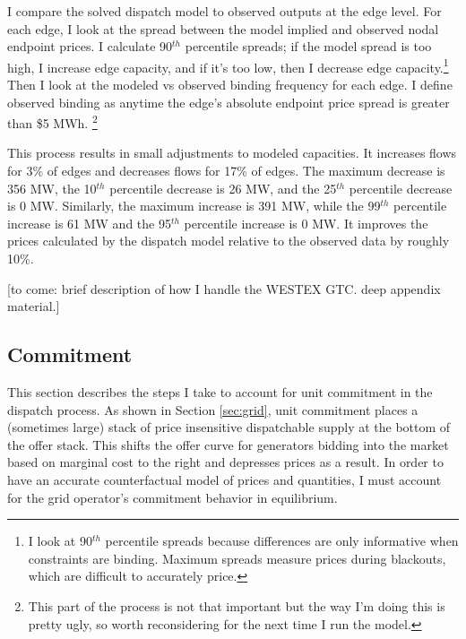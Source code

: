 \documentclass[12pt]{article}
\begin{document}
I compare the solved dispatch model to observed outputs at the edge level. For each edge, I look at the spread between the model implied and observed nodal endpoint prices. I calculate 90$^{th}$ percentile spreads; if the model spread is too high, I increase edge capacity, and if it's too low, then I decrease edge capacity.\footnote{I look at 90$^{th}$ percentile spreads because differences are only informative when constraints are binding. Maximum spreads measure prices during blackouts, which are difficult to accurately price.} Then I look at the modeled vs observed binding frequency for each edge. I define observed binding as anytime the edge's absolute endpoint price spread is greater than \$5 MWh. \footnote{This part of the process is not that important but the way I'm doing this is pretty ugly, so worth reconsidering for the next time I run the model.} 

This process results in small adjustments to modeled capacities. It increases flows for 3\% of edges and decreases flows for 17\% of edges. The maximum decrease is 356 MW, the 10$^{th}$ percentile decrease is 26 MW, and the 25$^{th}$ percentile decrease is 0 MW. Similarly, the maximum increase is 391 MW, while the 99$^{th}$ percentile increase is 61 MW and the 95$^{th}$ percentile increase is 0 MW. It improves the prices calculated by the dispatch model relative to the observed data by roughly 10\%. 

[to come: brief description of how I handle the WESTEX GTC. deep appendix material.]

\subsection{Commitment}
\label{sec:commitment}

This section describes the steps I take to account for unit commitment in the dispatch process. As shown in Section \ref{sec:grid}, unit commitment places a (sometimes large) stack of price insensitive dispatchable supply at the bottom of the offer stack. This shifts the offer curve for generators bidding into the market based on marginal cost to the right and depresses prices as a result. In order to have an accurate counterfactual model of prices and quantities, I must account for the grid operator's commitment behavior in equilibrium. 
\end{document}
